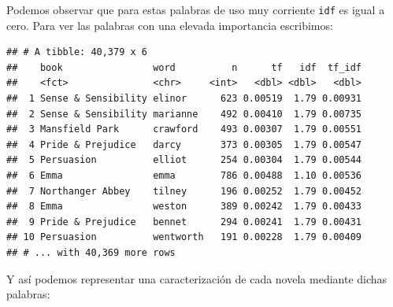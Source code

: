 \documentclass[]{article}
\newenvironment{Shaded}{\begin{snugshade}}{\end{snugshade}}
\newcommand{\KeywordTok}[1]{\textcolor[rgb]{0.13,0.29,0.53}{\textbf{#1}}}
\newcommand{\DataTypeTok}[1]{\textcolor[rgb]{0.13,0.29,0.53}{#1}}
\newcommand{\DecValTok}[1]{\textcolor[rgb]{0.00,0.00,0.81}{#1}}
\newcommand{\StringTok}[1]{\textcolor[rgb]{0.31,0.60,0.02}{#1}}
\newcommand{\OtherTok}[1]{\textcolor[rgb]{0.56,0.35,0.01}{#1}}
\newcommand{\OperatorTok}[1]{\textcolor[rgb]{0.81,0.36,0.00}{\textbf{#1}}}
\newcommand{\NormalTok}[1]{#1}
\begin{document}
Podemos observar que para estas palabras de uso muy corriente
\texttt{idf} es igual a cero. Para ver las palabras con una elevada
importancia escribimos:

\begin{Shaded}
\end{Shaded}

\begin{verbatim}
## # A tibble: 40,379 x 6
##    book                word          n      tf   idf  tf_idf
##    <fct>               <chr>     <int>   <dbl> <dbl>   <dbl>
##  1 Sense & Sensibility elinor      623 0.00519  1.79 0.00931
##  2 Sense & Sensibility marianne    492 0.00410  1.79 0.00735
##  3 Mansfield Park      crawford    493 0.00307  1.79 0.00551
##  4 Pride & Prejudice   darcy       373 0.00305  1.79 0.00547
##  5 Persuasion          elliot      254 0.00304  1.79 0.00544
##  6 Emma                emma        786 0.00488  1.10 0.00536
##  7 Northanger Abbey    tilney      196 0.00252  1.79 0.00452
##  8 Emma                weston      389 0.00242  1.79 0.00433
##  9 Pride & Prejudice   bennet      294 0.00241  1.79 0.00431
## 10 Persuasion          wentworth   191 0.00228  1.79 0.00409
## # ... with 40,369 more rows
\end{verbatim}

Y así podemos representar una caracterización de cada novela mediante
dichas palabras:

\begin{Shaded}
\end{Shaded}
\end{document}
